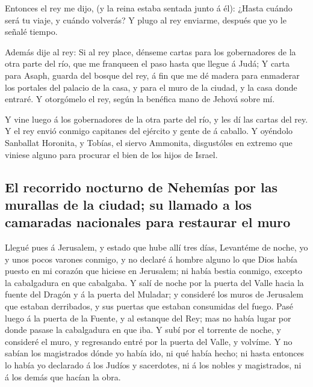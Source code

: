  Entonces el rey me dijo, (y la reina estaba sentada junto á
él): ¿Hasta cuándo será tu viaje, y cuándo volverás? Y plugo al rey
enviarme, después que yo le señalé tiempo.

 Además dije al rey: Si al rey place, dénseme cartas para
los gobernadores de la otra parte del río, que me franqueen el paso
hasta que llegue á Judá;  Y carta para Asaph, guarda del
bosque del rey, á fin que me dé madera para enmaderar los portales del
palacio de la casa, y para el muro de la ciudad, y la casa donde
entraré. Y otorgómelo el rey, según la benéfica mano de Jehová sobre mí.

 Y vine luego á los gobernadores de la otra parte del río, y
les dí las cartas del rey. Y el rey envió conmigo capitanes del ejército
y gente de á caballo.  Y oyéndolo Sanballat Horonita, y
Tobías, el siervo Ammonita, disgustóles en extremo que viniese alguno
para procurar el bien de los hijos de Israel.

\hypertarget{el-recorrido-nocturno-de-nehemuxedas-por-las-murallas-de-la-ciudad-su-llamado-a-los-camaradas-nacionales-para-restaurar-el-muro}{%
\subsection{El recorrido nocturno de Nehemías por las murallas de la
ciudad; su llamado a los camaradas nacionales para restaurar el
muro}\label{el-recorrido-nocturno-de-nehemuxedas-por-las-murallas-de-la-ciudad-su-llamado-a-los-camaradas-nacionales-para-restaurar-el-muro}}

 Llegué pues á Jerusalem, y estado que hube allí tres días,
 Levantéme de noche, yo y unos pocos varones conmigo, y no
declaré á hombre alguno lo que Dios había puesto en mi corazón que
hiciese en Jerusalem; ni había bestia conmigo, excepto la cabalgadura en
que cabalgaba.  Y salí de noche por la puerta del Valle
hacia la fuente del Dragón y á la puerta del Muladar; y consideré los
muros de Jerusalem que estaban derribados, y sus puertas que estaban
consumidas del fuego.  Pasé luego á la puerta de la Fuente,
y al estanque del Rey; mas no había lugar por donde pasase la
cabalgadura en que iba.  Y subí por el torrente de noche, y
consideré el muro, y regresando entré por la puerta del Valle, y
volvíme.  Y no sabían los magistrados dónde yo había ido,
ni qué había hecho; ni hasta entonces lo había yo declarado á los Judíos
y sacerdotes, ni á los nobles y magistrados, ni á los demás que hacían
la obra.

